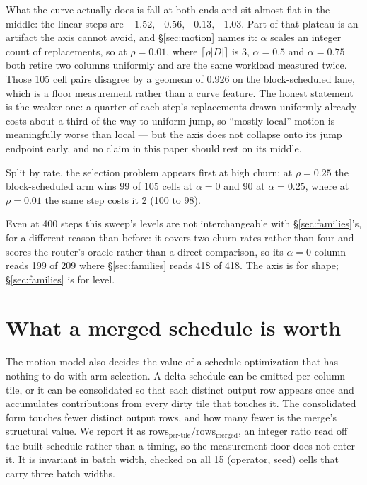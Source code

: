 \documentclass{article}
\begin{document}
What the curve actually does is fall at both ends and sit almost flat in the
middle: the linear steps are $-1.52, -0.56, -0.13, -1.03$. Part of that plateau
is an artifact the axis cannot avoid, and \S\ref{sec:motion} names it: $\alpha$
scales an integer count of replacements, so at $\rho{=}0.01$, where
$\lceil \rho|D| \rceil$ is 3, $\alpha{=}0.5$ and $\alpha{=}0.75$ both retire two
columns uniformly and are the same workload measured twice. Those 105 cell pairs
disagree by a geomean of $0.926$ on the block-scheduled lane, which is a floor
measurement rather than a curve feature. The honest statement is the weaker one:
a quarter of each step's replacements drawn uniformly already costs about a
third of the way to uniform jump, so ``mostly local'' motion is meaningfully
worse than local --- but the axis does not collapse onto its jump endpoint
early, and no claim in this paper should rest on its middle.

Split by rate, the selection problem appears first at high churn: at
$\rho{=}0.25$ the block-scheduled arm wins 99 of 105 cells at $\alpha{=}0$ and 90
at $\alpha{=}0.25$, where at $\rho{=}0.01$ the same step costs it 2 (100 to 98).

Even at 400 steps this sweep's levels are not interchangeable with
\S\ref{sec:families}'s, for a different reason than before: it covers two churn
rates rather than four and scores the router's oracle rather than a direct
comparison, so its $\alpha{=}0$ column reads 199 of 209 where \S\ref{sec:families}
reads 418 of 418. The axis is for shape; \S\ref{sec:families} is for level.

\section{What a merged schedule is worth}
\label{sec:merge}

The motion model also decides the value of a schedule optimization that has
nothing to do with arm selection. A delta schedule can be emitted per
column-tile, or it can be consolidated so that each distinct output row appears
once and accumulates contributions from every dirty tile that touches it. The
consolidated form touches fewer distinct output rows, and how many fewer is the
merge's structural value. We report it as $\mathrm{rows}_{\text{per-tile}} /
\mathrm{rows}_{\text{merged}}$, an integer ratio read off the built schedule
rather than a timing, so the measurement floor does not enter it. It is
invariant in batch width, checked on all 15 (operator, seed) cells that carry
three batch widths.
\end{document}
